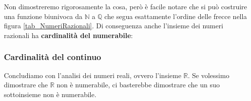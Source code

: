 Non dimostreremo rigorosamente la cosa, però è facile notare che si può 
costruire una funzione biunivoca da $\mathbb{N}$ a $\mathbb{Q}$ che segua 
esattamente l'ordine delle frecce nella figura \ref{tab_NumeriRazionali}. 
Di conseguenza anche l'insieme dei numeri razionali ha \textbf{cardinalità del 
numerabile}:

\subsubsection{Cardinalità del continuo}
Concludiamo con l'analisi dei numeri reali, ovvero l'insieme $\mathbb{R}$. Se 
volessimo dimostrare che $\mathbb{R}$ non è numerabile, ci basterebbe 
dimostrare che un suo sottoinsieme non è numerabile.
